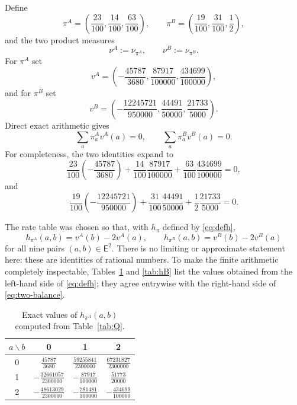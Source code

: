 \documentclass[11pt]{article}
\newcommand{\EE}{\mathsf E}
\newcommand{\nuA}{\nu^{A}}
\newcommand{\nuB}{\nu^{B}}
\begin{document}
Define
\begin{equation}
  \pi^A=\left(\frac{23}{100},\frac{14}{100},\frac{63}{100}\right),
  \qquad
  \pi^B=\left(\frac{19}{100},\frac{31}{100},\frac12\right),
  \label{eq:pis}
\end{equation}
and the two product measures
\[
  \nuA:=\nu_{\pi^A},\qquad \nuB:=\nu_{\pi^B}.
\]
For $\pi^A$ set
\begin{equation}
 v^A=
 \left(
 -\frac{45787}{3680},
 \frac{87917}{100000},
 \frac{434699}{100000}
 \right),
 \label{eq:vA}
\end{equation}
and for $\pi^B$ set
\begin{equation}
 v^B=
 \left(
 -\frac{12245721}{950000},
 \frac{44491}{50000},
 \frac{21733}{5000}
 \right).
 \label{eq:vB}
\end{equation}
Direct exact arithmetic gives
\begin{equation}
 \sum_a\pi^A_a v^A(a)=0,
 \qquad
 \sum_a\pi^B_a v^B(a)=0.
 \label{eq:meanszero}
\end{equation}
For completeness, the two identities expand to
\[
 \frac{23}{100}\left(-\frac{45787}{3680}\right)
 +\frac{14}{100}\frac{87917}{100000}
 +\frac{63}{100}\frac{434699}{100000}=0,
\]
and
\[
 \frac{19}{100}\left(-\frac{12245721}{950000}\right)
 +\frac{31}{100}\frac{44491}{50000}
 +\frac12\frac{21733}{5000}=0.
\]

The rate table was chosen so that, with $h_\pi$ defined by
\eqref{eq:defh},
\begin{equation}
 h_{\pi^A}(a,b)=v^A(b)-2v^A(a),
 \qquad
 h_{\pi^B}(a,b)=v^B(b)-2v^B(a)
 \label{eq:two-balance}
\end{equation}
for all nine pairs $(a,b)\in\EE^2$.  There is no limiting or approximate
statement here: these are identities of rational numbers.  To make the finite
arithmetic completely inspectable, Tables~\ref{tab:hA} and \ref{tab:hB} list
the values obtained from the left-hand side of \eqref{eq:defh}; they agree
entrywise with the right-hand side of \eqref{eq:two-balance}.

\begin{table}[ht]
\centering
\caption{Exact values of $h_{\pi^A}(a,b)$ computed from Table~\ref{tab:Q}.}
\label{tab:hA}
\begin{tabular}{c|ccc}
\toprule
$a\backslash b$&0&1&2\\
\midrule
0&$\frac{45787}{3680}$&$\frac{59255841}{2300000}$&$\frac{67231827}{2300000}$\\
1&$-\frac{32661057}{2300000}$&$-\frac{87917}{100000}$&$\frac{51773}{20000}$\\
2&$-\frac{48613029}{2300000}$&$-\frac{781481}{100000}$&$-\frac{434699}{100000}$\\
\bottomrule
\end{tabular}
\end{table}
\end{document}
